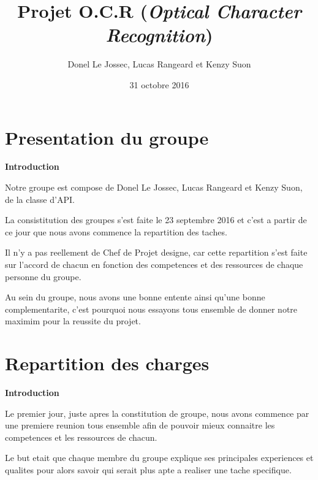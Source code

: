 \documentclass[a4paper, 12pt]{report}
\title{Projet O.C.R (\textit{Optical Character Recognition})}
\author{Donel Le Jossec, Lucas Rangeard et Kenzy Suon}
\date{31 octobre 2016}
\begin{document}
\maketitle

\tableofcontents

\part{Presentation du groupe}
	

	\huge {\bfseries Introduction \newline } \\
	
	\Large
	
	Notre groupe est compose de Donel Le Jossec, Lucas Rangeard et Kenzy Suon, de la classe d'API. \newline
	
	La consistitution des groupes s'est faite le 23 septembre 2016 et c'est a partir de ce jour que nous avons commence la repartition des taches. \newline

	Il n'y a pas reellement de Chef de Projet designe, car cette repartition s'est faite sur l'accord de chacun en fonction des competences et des ressources de chaque personne du groupe. \newline

	Au sein du groupe, nous avons une bonne entente ainsi qu'une bonne complementarite, c'est pourquoi nous essayons tous ensemble de donner notre maximim pour la reussite du projet. \\


        
\part{Repartition des charges}

	\huge {\bfseries Introduction } \\
	
	\Large
	
	Le premier jour, juste apres la constitution de groupe, nous avons commence par une premiere reunion tous ensemble afin de pouvoir mieux connaitre les competences et les ressources de chacun. \newline
	
	
	Le but etait que chaque membre du groupe explique ses principales experiences et qualites pour alors savoir qui serait plus apte a realiser une tache specifique. \newline
	
\end{document}
